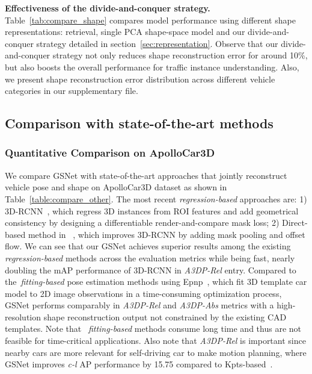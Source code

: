 \documentclass[runningheads]{llncs}
\begin{document}
\smallskip\noindent\textbf{Effectiveness of the divide-and-conquer strategy.}
Table~\ref{tab:compare_shape} compares model performance using different shape representations: retrieval, single PCA shape-space model and our divide-and-conquer strategy detailed in section~\ref{sec:representation}. Observe that our divide-and-conquer strategy not only reduces shape reconstruction error for around 10\%, but also boosts the overall performance for traffic instance understanding.  Also, we present shape reconstruction error distribution across different vehicle categories in our supplementary file.

\subsection{Comparison with state-of-the-art methods}
\label{sec:performance}

\subsubsection{Quantitative Comparison on ApolloCar3D}
\label{sec:quantitative_analysis}
We compare GSNet with state-of-the-art approaches that jointly reconstruct vehicle pose and shape on ApolloCar3D dataset as shown in Table~\ref{table:compare_other}. 
The most recent \textit{regression-based} approaches are:
1) 3D-RCNN~\cite{kundu20183d}, which regress 3D instances from ROI features and add geometrical consistency by designing a differentiable render-and-compare mask loss;
2) Direct-based method in ~\cite{song2019apollocar3d}, which improves 3D-RCNN by adding mask pooling and offset flow.
We can see that our GSNet achieves superior results among the existing \textit{regression-based} methods across the evaluation metrics while being fast, nearly doubling the mAP performance of 3D-RCNN in \textit{A3DP-Rel} entry. Compared to the~\textit{fitting-based} pose estimation methods using Epnp~\cite{lepetit2009epnp}, which fit 3D template car model to 2D image observations in a time-consuming optimization process, GSNet performs comparably in \textit{A3DP-Rel} and \textit{A3DP-Abs} metrics with a high-resolution shape reconstruction output not constrained by the existing CAD templates. Note that ~\textit{fitting-based} methods consume long time and thus are not feasible for time-critical applications. Also note that \textit{A3DP-Rel} is important since nearby cars are more relevant for self-driving car to make motion planning, where GSNet improves \textit{c-l} AP performance by 15.75 compared to Kpts-based~\cite{song2019apollocar3d}. 
\end{document}
